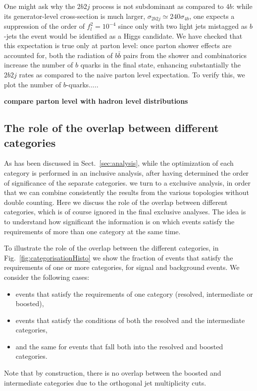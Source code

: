   One might ask why the $2b2j$ process
  is not subdominant as compared to $4b$: while its generator-level cross-section is
  much larger, $\sigma_{2b2j} \simeq 240\sigma_{4b}$, one expects a suppression
  of the order of $f_l^2 =10^{-4}$ since only with two light jets mistagged as $b$-jets the event
  would be identified as a Higgs candidate.
  We have checked that this expectation is true only at parton level: once parton shower effects
  are accounted for, both the radiation of $b\bar{b}$ pairs from the shower and combinatorics increase
  the number of $b$ quarks in the final state, enhancing substantially the $2b2j$ rates as compared
  to the naive parton level expectation.
  To verify this, we plot the number of $b$-quarks.....

  {\bf compare parton level with hadron level distributions}



  \subsection{The role of the overlap between different categories}
\label{sec:overlap}

As has been discussed in Sect.~\ref{sec:analysis}, while the optimization of each
category is performed in an inclusive analysis, after having determined the order
of significance of the separate categories. we turn to a exclusive analysis,
in order that
we can combine consistently the results from the various topologies without double
counting.
%
Here we discuss the role of the overlap
between  different categories, which is of course ignored in the final exclusive
analyses.
%
The idea is to understand how significant the information is on which events satisfy the requirements
of more than one category at the same time.

To illustrate the role of the overlap between the different categories, in
Fig.~\ref{fig:categorisationHisto} we show the fraction of events that satisfy the requirements
of one or more categories, for signal and background events.
%
We consider the following cases:
\begin{itemize}
\item events that satisfy the requirements of one category (resolved,
  intermediate or boosted),
\item events that satisfy the conditions of both the resolved and the intermediate categories,
\item and the same for events that fall both
  into the resolved and boosted categories.
\end{itemize}
 Note that by construction, there is no overlap between the boosted
  and intermediate categories due to the
 orthogonal jet multiplicity cuts.

